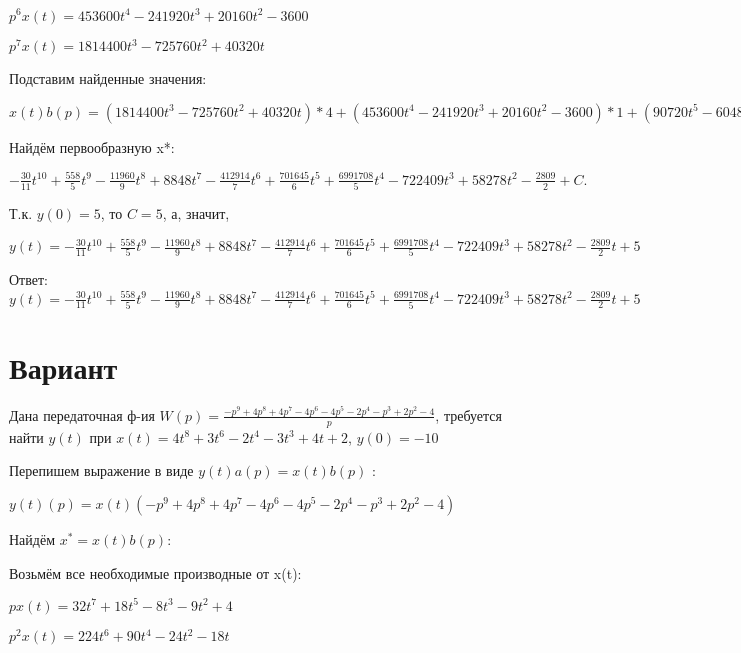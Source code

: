 \documentclass{article}
\begin{document}
{{{{{$p^6x(t)=453600t^{4}-241920t^{3}+20160t^{2}-3600$

$p^7x(t)=1814400t^{3}-725760t^{2}+40320t$

Подставим найденные значения:

$x(t)b(p) = (1814400t^{3}-725760t^{2}+40320t)*4+(453600t^{4}-241920t^{3}+20160t^{2}-3600)*1+(90720t^{5}-60480t^{4}+6720t^{3}-3600t-120)*(-4)+(15120t^{6}-12096t^{5}+1680t^{4}-1800t^{2}-120t+72)*4+(2160t^{7}-2016t^{6}+336t^{5}-600t^{3}-60t^{2}+72t)*(-5)+(270t^{8}-288t^{7}+56t^{6}-150t^{4}-20t^{3}+36t^{2}+6)*4+(30t^{9}-36t^{8}+8t^{7}-30t^{5}-5t^{4}+12t^{3}+6t+1)*(-4)+(30t^{9}-36t^{8}+8t^{7}-30t^{5}-5t^{4}+12t^{3}+6t+1)*3=-30t^{9}+1116t^{8}-11960t^{7}+70784t^{6}-412914t^{5}+701645t^{4}+6991708t^{3}-2889636t^{2}+174834t$





Найдём первообразную x*:

$-\frac{30}{11}t^{10}+\frac{558}{5}t^{9}-\frac{11960}{9}t^{8}+8848t^{7}-\frac{412914}{7}t^{6}+\frac{701645}{6}t^{5}+\frac{6991708}{5}t^{4}-722409t^{3}+58278t^{2}-\frac{2809}{2}+C.$

Т.к. $y(0)=5$, то $C=5$, а, значит, 

$y(t)=-\frac{30}{11}t^{10}+\frac{558}{5}t^{9}-\frac{11960}{9}t^{8}+8848t^{7}-\frac{412914}{7}t^{6}+\frac{701645}{6}t^{5}+\frac{6991708}{5}t^{4}-722409t^{3}+58278t^{2}-\frac{2809}{2}t+5$

Ответ: $y(t) = -\frac{30}{11}t^{10}+\frac{558}{5}t^{9}-\frac{11960}{9}t^{8}+8848t^{7}-\frac{412914}{7}t^{6}+\frac{701645}{6}t^{5}+\frac{6991708}{5}t^{4}-722409t^{3}+58278t^{2}-\frac{2809}{2}t+5$

\section{Вариант}

Дана передаточная ф-ия $W(p)=\frac{-p^{9}+4p^{8}+4p^{7}-4p^{6}-4p^{5}-2p^{4}-p^{3}+2p^{2}-4}{p}$, требуется найти $y(t)$ при $x(t)=4t^{8}+3t^{6}-2t^{4}-3t^{3}+4t+2$, $y(0)=-10$

Перепишем выражение в виде $y(t)a(p)=x(t)b(p)$ :

$y(t)(p)=x(t)(-p^{9}+4p^{8}+4p^{7}-4p^{6}-4p^{5}-2p^{4}-p^{3}+2p^{2}-4)$

Найдём $x^*=x(t)b(p)$:

Возьмём все необходимые производные от x(t):

$px(t)=32t^{7}+18t^{5}-8t^{3}-9t^{2}+4$

$p^2x(t)=224t^{6}+90t^{4}-24t^{2}-18t$

}}}}}
\end{document}
